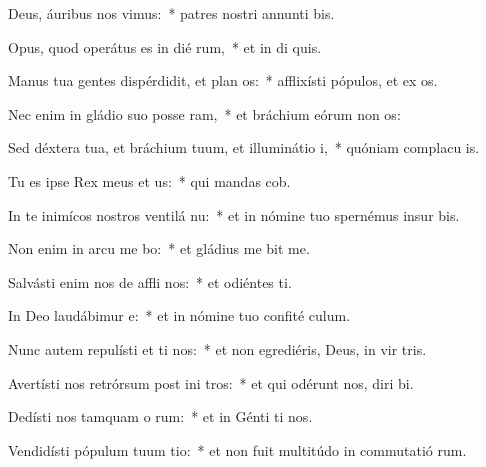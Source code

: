 \item Deus, áuribus nos vimus:~* patres nostri annunti bis.
\item Opus, quod operátus es in dié rum,~* et in di quis.
\item Manus tua gentes dispérdidit, et plan os:~* afflixísti pópulos, et ex os.
\item Nec enim in gládio suo posse ram,~* et bráchium eórum non  os:
\item Sed déxtera tua, et bráchium tuum, et illuminátio  i,~* quóniam complacu  is.
\item Tu es ipse Rex meus et  us:~* qui mandas  cob.
\item In te inimícos nostros ventilá nu:~* et in nómine tuo spernémus insur  bis.
\item Non enim in arcu me bo:~* et gládius me  bit me.
\item Salvásti enim nos de affli nos:~* et odiéntes  ti.
\item In Deo laudábimur  e:~* et in nómine tuo confité  culum.
\item Nunc autem repulísti et ti nos:~* et non egrediéris, Deus, in vir tris.
\item Avertísti nos retrórsum post ini tros:~* et qui odérunt nos, diri bi.
\item Dedísti nos tamquam o rum:~* et in Génti ti nos.
\item Vendidísti pópulum tuum  tio:~* et non fuit multitúdo in commutatió rum.
